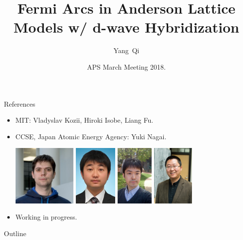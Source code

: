 \documentclass[xcolor=table, 10pt, aspectratio=169]{beamer}
\title[Fermi Arcs] %
{Fermi Arcs in Anderson Lattice Models w/ d-wave Hybridization}
\author[Y Qi] %
{Yang~Qi}
\institute[Fudan] %
{Department of Physics, Fudan University}
\date{APS March Meeting 2018.}
\begin{document}
\begin{frame}
  \titlepage
\end{frame}

\begin{frame}{References}
\begin{itemize}
\item MIT: Vladyslav Kozii, Hiroki Isobe, Liang Fu.
\item CCSE, Japan Atomic Energy Agency: Yuki Nagai.
\begin{center}
	\includegraphics[height=3cm]{../people/vlad}
	\includegraphics[height=3cm]{../people/yuki}
	\includegraphics[height=3cm]{../people/hiroki}
	\includegraphics[height=3cm]{../people/liangfu}
\end{center}
\item Working in progress.
\end{itemize}
\end{frame}

\begin{frame}{Outline}
		\tableofcontents
\end{frame}
\end{document}
